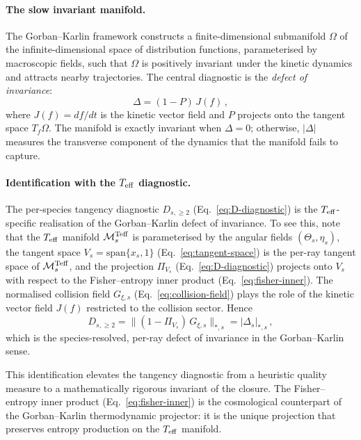 \paragraph{The slow invariant manifold.}

The Gorban--Karlin framework constructs a
finite-dimensional submanifold $\Omega$ of the
infinite-dimensional space of distribution functions,
parameterised by macroscopic fields, such that
$\Omega$ is positively invariant under the kinetic
dynamics and attracts nearby trajectories.  The
central diagnostic is the \emph{defect of invariance}:
\begin{equation}\label{eq:defect-invariance}
\Delta = (1 - P)\, J(f)\,,
\end{equation}
where $J(f) = df/dt$ is the kinetic vector field and
$P$ projects onto the tangent space $T_f \Omega$.
The manifold is exactly invariant when $\Delta = 0$;
otherwise, $|\Delta|$ measures the transverse component
of the dynamics that the manifold fails to capture.


\paragraph{Identification with the $T_{\mathrm{eff}}$ diagnostic.}

The per-species tangency diagnostic $D_{s,\geq 2}$
(Eq.~\ref{eq:D-diagnostic}) is the $T_{\mathrm{eff}}$-specific
realisation of the Gorban--Karlin defect of invariance.
To see this, note that the $T_{\mathrm{eff}}$ manifold
$\mathcal{M}_s^{\rm Teff}$ is parameterised by the
angular fields $(\Theta_s, \eta_s)$, the tangent space
$V_s = \mathrm{span}\{x_s, 1\}$
(Eq.~\ref{eq:tangent-space}) is the per-ray tangent
space of $\mathcal{M}_s^{\rm Teff}$, and the projection
$\Pi_{V_s}$ (Eq.~\ref{eq:D-diagnostic}) projects onto
$V_s$ with respect to the Fisher--entropy inner product
(Eq.~\ref{eq:fisher-inner}).  The normalised collision
field $G_{\xi,s}$
(Eq.~\ref{eq:collision-field}) plays the role of the
kinetic vector field $J(f)$ restricted to the collision
sector.  Hence
\begin{equation}\label{eq:D-equals-Delta}
D_{s,\geq 2}
= \big\| (1 - \Pi_{V_s})\, G_{\xi,s} \big\|_{*,s}
= |\Delta_s|_{*,s}\,,
\end{equation}
which is the species-resolved, per-ray defect of
invariance in the Gorban--Karlin sense.

This identification elevates the tangency diagnostic from
a heuristic quality measure to a mathematically rigorous
invariant of the closure.  The Fisher--entropy inner
product (Eq.~\ref{eq:fisher-inner}) is the cosmological
counterpart of the Gorban--Karlin thermodynamic
projector: it is the unique projection that preserves
entropy production on the $T_{\mathrm{eff}}$ manifold.


